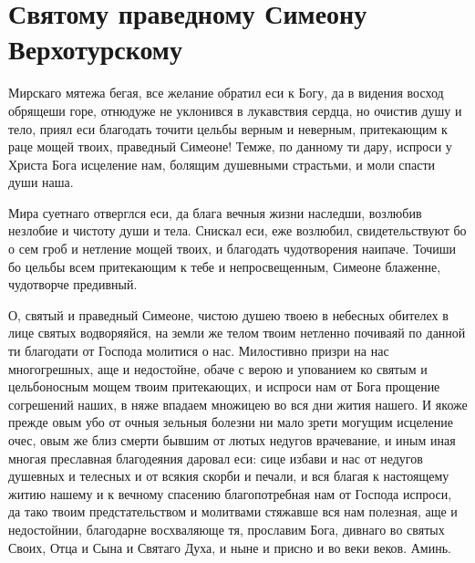 \section{Святому праведному Симеону Верхотурскому}\begin{mymulticols}


Мирскаго мятежа бегая, все желание обратил еси к Богу, да в видения восход обрящеши горе, отнюдуже не уклонився в лукавствия сердца, но очистив душу и тело, приял еси благодать точити цельбы верным и неверным, притекающим к раце мощей твоих, праведный Симеоне! Темже, по данному ти дару, испроси у Христа Бога исцеление нам, болящим душевными страстьми, и моли спасти души наша.


Мира суетнаго отверглся еси, да блага вечныя жизни наследши, возлюбив незлобие и чистоту души и тела. Снискал еси, еже возлюбил, свидетельствуют бо о сем гроб и нетление мощей твоих, и благодать чудотворения наипаче. Точиши бо цельбы всем притекающим к тебе и непросвещенным, Симеоне блаженне, чудотворче предивный.


О, святый и праведный Симеоне, чистою душею твоею в небесных обителех в лице святых водворяяйся, на земли же телом твоим нетленно почиваяй по данной ти благодати от Господа молитися о нас. Милостивно призри на нас многогрешных, аще и недостойне, обаче с верою и упованием ко святым и цельбоносным мощем твоим притекающих, и испроси нам от Бога прощение согрешений наших, в няже впадаем множицею во вся дни жития нашего. И якоже прежде овым убо от очныя зельныя болезни ни мало зрети могущим исцеление очес, овым же близ смерти бывшим от лютых недугов врачевание, и иным иная многая преславная благодеяния даровал еси: сице избави и нас от недугов душевных и телесных и от всякия скорби и печали, и вся благая к настоящему житию нашему и к вечному спасению благопотребная нам от Господа испроси, да тако твоим предстательством и молитвами стяжавше вся нам полезная, аще и недостойнии, благодарне восхваляюще тя, прославим Бога, дивнаго во святых Своих, Отца и Сына и Святаго Духа, и ныне и присно и во веки веков. Аминь.

\end{mymulticols}

\mychapterending


